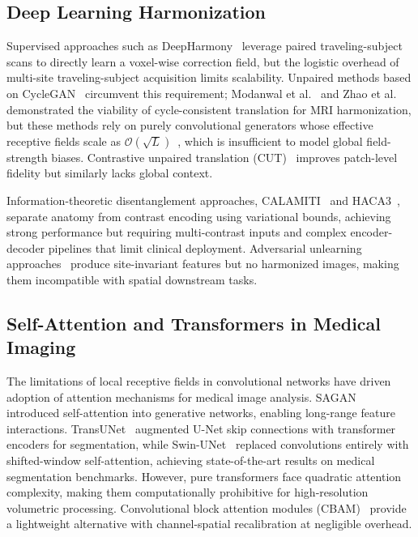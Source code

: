 \documentclass{article}
\begin{document}
\subsection{Deep Learning Harmonization}

Supervised approaches such as DeepHarmony~\cite{dewey2019deepharmony} leverage paired
traveling-subject scans to directly learn a voxel-wise correction field, but the logistic
overhead of multi-site traveling-subject acquisition limits scalability. Unpaired methods
based on CycleGAN~\cite{goodfellow2014gan,zhu2017cyclegan} circumvent this requirement; Modanwal et
al.~\cite{modanwal2020mri} and Zhao et al.~\cite{zhao2019harmonization} demonstrated the
viability of cycle-consistent translation for MRI harmonization, but these methods rely
on purely convolutional generators whose effective receptive fields scale as
$\mathcal{O}(\sqrt{L})$~\cite{luo2016erf}, which is insufficient to model global field-strength
biases. Contrastive unpaired translation (CUT)~\cite{park2020cut} improves patch-level
fidelity but similarly lacks global context.

Information-theoretic disentanglement approaches, CALAMITI~\cite{zuo2021calamiti} and
HACA3~\cite{zuo2023haca3}, separate anatomy from contrast encoding using variational
bounds, achieving strong performance but requiring multi-contrast inputs and complex
encoder-decoder pipelines that limit clinical deployment. Adversarial unlearning
approaches~\cite{dinsdale2021deep} produce site-invariant features but no harmonized
images, making them incompatible with spatial downstream tasks.

\subsection{Self-Attention and Transformers in Medical Imaging}

The limitations of local receptive fields in convolutional networks have driven adoption
of attention mechanisms for medical image analysis. SAGAN~\cite{zhang2019sagan}
introduced self-attention into generative networks, enabling long-range feature
interactions. TransUNet~\cite{chen2021transunet} augmented U-Net skip connections with
transformer encoders for segmentation, while Swin-UNet~\cite{cao2022swinunet} replaced
convolutions entirely with shifted-window self-attention, achieving state-of-the-art
results on medical segmentation benchmarks. However, pure transformers face quadratic
attention complexity, making them computationally prohibitive for high-resolution
volumetric processing. Convolutional block attention modules (CBAM)~\cite{woo2018cbam}
provide a lightweight alternative with channel-spatial recalibration at negligible
overhead.
\end{document}
